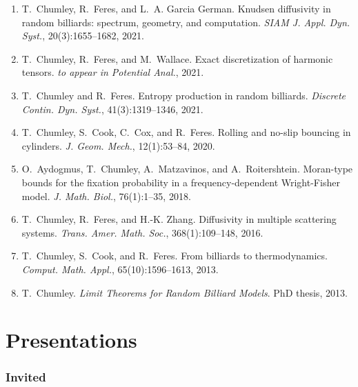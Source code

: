 \documentclass[10pt,letterpaper]{article}
\providecommand{\tightlist}{%
  \setlength{\itemsep}{0pt}\setlength{\parskip}{0pt}}
\let\tightlist\relax
\begin{document}
\begin{enumerate}
\def\labelenumi{\arabic{enumi}.}
\tightlist
\item
  \protect\hypertarget{CFG2020}{}{} T.~Chumley, R.~Feres, and L.~A.
  Garcia German. Knudsen diffusivity in random billiards: spectrum,
  geometry, and computation. \emph{SIAM J. Appl. Dyn. Syst.},
  20(3):1655--1682, 2021.
\item
  \protect\hypertarget{CFW2016}{}{} T.~Chumley, R.~Feres, and
  M.~Wallace. Exact discretization of harmonic tensors. \emph{to appear
  in Potential Anal.}, 2021.
\item
  \protect\hypertarget{CF2019}{}{} T.~Chumley and R.~Feres. Entropy
  production in random billiards. \emph{Discrete Contin. Dyn. Syst.},
  41(3):1319--1346, 2021.
\item
  \protect\hypertarget{CCCF2018}{}{} T.~Chumley, S.~Cook, C.~Cox, and
  R.~Feres. Rolling and no-slip bouncing in cylinders. \emph{J. Geom.
  Mech.}, 12(1):53--84, 2020.
\item
  \protect\hypertarget{ACMR2016}{}{} O.~Aydogmus, T.~Chumley,
  A.~Matzavinos, and A.~Roitershtein. Moran-type bounds for the fixation
  probability in a frequency-dependent Wright-Fisher model. \emph{J.
  Math. Biol.}, 76(1):1--35, 2018.
\item
  \protect\hypertarget{CFZ2016}{}{} T.~Chumley, R.~Feres, and H.-K.
  Zhang. Diffusivity in multiple scattering systems. \emph{Trans. Amer.
  Math. Soc.}, 368(1):109--148, 2016.
\item
  \protect\hypertarget{CCF2013}{}{} T.~Chumley, S.~Cook, and R.~Feres.
  From billiards to thermodynamics. \emph{Comput. Math. Appl.},
  65(10):1596--1613, 2013.
\item
  \protect\hypertarget{CT}{}{} T.~Chumley. \emph{Limit Theorems for
  Random Billiard Models}. PhD thesis, 2013.
\end{enumerate}

\hypertarget{invited-presentations}{%
\section*{Presentations}\label{invited-presentations}}

\hypertarget{invited}{%
\subsubsection*{Invited}\label{invited}}
\end{document}
